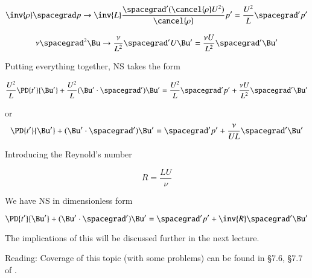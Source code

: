 \begin{equation}\label{eqn:continuumL14:410}
\inv{\rho} \spacegrad p \rightarrow \inv{L} \frac{\spacegrad' (\cancel{\rho} U^2) }{\cancel{\rho}} p' = \frac{U^2}{L} \spacegrad' p'
\end{equation}

\begin{equation}\label{eqn:continuumL14:430}
\nu \spacegrad^2 \Bu \rightarrow \frac{\nu}{L^2} \spacegrad' U \Bu' = \frac{\nu U}{L^2} \spacegrad' \Bu'
\end{equation}

Putting everything together, NS takes the form

\begin{equation}\label{eqn:continuumL14:450}
\frac{U^2}{L} \PD{t'}{\Bu'} + \frac{U^2}{L} (\Bu' \cdot \spacegrad') \Bu' = \frac{U^2}{L} \spacegrad' p' + \frac{\nu U}{L^2} \spacegrad' \Bu'
\end{equation}

or
\begin{equation}\label{eqn:continuumL14:470}
\PD{t'}{\Bu'} + (\Bu' \cdot \spacegrad') \Bu' = \spacegrad' p' + \frac{\nu}{U L} \spacegrad' \Bu'
\end{equation}

Introducing the Reynold's number

\begin{equation}\label{eqn:continuumL14:490}
R = \frac{L U}{\nu}
\end{equation}

We have NS in dimensionless form

\begin{equation}\label{eqn:continuumL14:510}
\PD{t'}{\Bu'} + (\Bu' \cdot \spacegrad') \Bu' = \spacegrad' p' + \inv{R} \spacegrad' \Bu'
\end{equation}

The implications of this will be discussed further in the next lecture.

Reading: Coverage of this topic (with some problems) can be found in \S 7.6, \S 7.7 of \cite{granger1995fluid}.

\EndArticle
